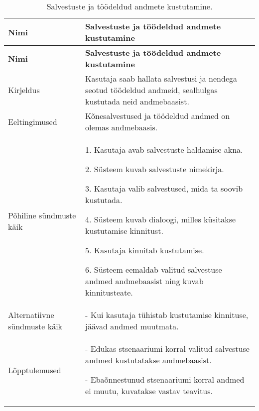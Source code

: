 \begin{longtable}{|p{2.5cm}|p{11cm}|}
    \caption{{Salvestuste ja töödeldud andmete kustutamine.}}
    \label{tab:kasutusjuht2}\\ \hline
    \textbf{Nimi} &  \textbf{Salvestuste ja töödeldud andmete kustutamine}  \\
    \hline
    \endfirsthead
    \hline
    \textbf{Nimi} &  \textbf{Salvestuste ja töödeldud andmete kustutamine}  \\
    \hline
    \endhead
    \endfoot
    \hline
    \endlastfoot
    Kirjeldus & Kasutaja saab hallata salvestusi ja nendega seotud töödeldud andmeid, sealhulgas kustutada neid andmebaasist.\\ \hline
    Eeltingimused & Kõnesalvestused ja töödeldud andmed on olemas andmebaasis.\\ \hline
    Põhiline sündmuste käik & 
    1. Kasutaja avab salvestuste haldamise akna.
    
    2. Süsteem kuvab salvestuste nimekirja.
    
    3. Kasutaja valib salvestused, mida ta soovib kustutada.
    
    4. Süsteem kuvab dialoogi, milles küsitakse kustutamise kinnitust.
    
    5. Kasutaja kinnitab kustutamise.
    
    6. Süsteem eemaldab valitud salvestuse andmed andmebaasist ning kuvab kinnitusteate.
    \\ \hline
    Alternatiivne sündmuste käik & 
    - Kui kasutaja tühistab kustutamise kinnituse, jäävad andmed muutmata.
    \\ \hline
    Lõpptulemused & 
    - Edukas stsenaariumi korral valitud salvestuse andmed kustutatakse andmebaasist.
    
    - Ebaõnnestunud stsenaariumi korral andmed ei muutu, kuvatakse vastav teavitus.
    \\ \hline
\end{longtable}


